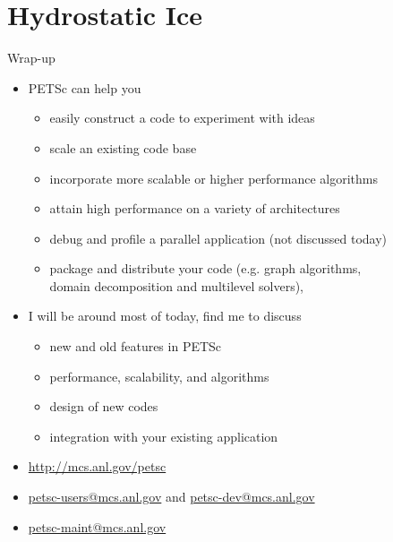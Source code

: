 \documentclass{beamer}
\begin{document}
\section{Hydrostatic Ice}






\begin{frame}{Wrap-up}
  \begin{itemize}
  \item PETSc can help you
    \begin{itemize}
    \item easily construct a code to experiment with ideas
    \item scale an existing code base
    \item incorporate more scalable or higher performance algorithms
    \item attain high performance on a variety of architectures
    \item debug and profile a parallel application (not discussed today)
    \item package and distribute your code (e.g. graph algorithms, \\
      domain decomposition and multilevel solvers), 
    \end{itemize}
  \item I will be around most of today, find me to discuss
    \begin{itemize}
    \item new and old features in PETSc
    \item performance, scalability, and algorithms
    \item design of new codes
    \item integration with your existing application
    \end{itemize}
  \item \url{http://mcs.anl.gov/petsc}
  \item \url{petsc-users@mcs.anl.gov} and \url{petsc-dev@mcs.anl.gov}
  \item \url{petsc-maint@mcs.anl.gov}
  \end{itemize}
\end{frame}
\end{document}
